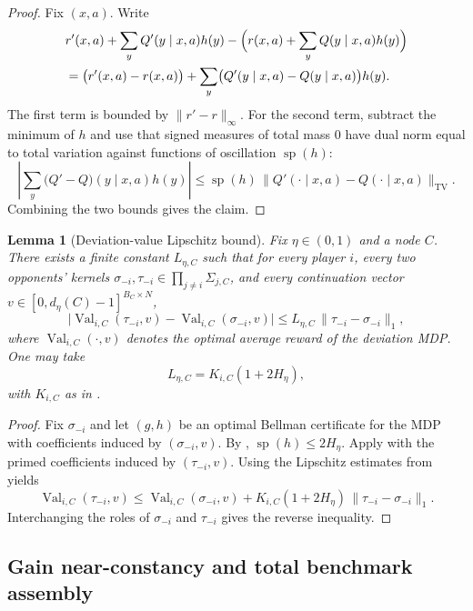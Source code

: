 \documentclass[12pt]{article}
\newtheorem{lemma}[theorem]{Lemma}
\theoremstyle{definition}
\newcommand{\1}{\mathbf{1}}
\DeclareMathOperator{\spn}{sp}
\begin{document}
\begin{proof}
Fix $(x,a)$. Write
\begin{align*}
&r'(x,a)+\sum_y Q'(y\mid x,a)h(y)
-
\Bigl(r(x,a)+\sum_y Q(y\mid x,a)h(y)\Bigr)
\\
&= \bigl(r'(x,a)-r(x,a)\bigr)
+
\sum_y\bigl(Q'(y\mid x,a)-Q(y\mid x,a)\bigr)h(y).
\end{align*}
The first term is bounded by $\|r'-r\|_\infty$. For the second term, subtract the
minimum of $h$ and use that signed measures of total mass $0$ have dual norm equal
to total variation against functions of oscillation $\spn(h)$:
\[
\left|\sum_y\bigl(Q'-Q\bigr)(y\mid x,a)h(y)\right|
\le
\spn(h)\,\|Q'(\cdot\mid x,a)-Q(\cdot\mid x,a)\|_{\mathrm{TV}}.
\]
Combining the two bounds gives the claim.
\end{proof}

\begin{lemma}[Deviation-value Lipschitz bound]
\label{lem:deviation-lipschitz}
Fix $\eta\in(0,1)$ and a node $C$. There exists a finite constant $L_{\eta,C}$
such that for every player $i$, every two opponents' kernels
$\sigma_{-i},\tau_{-i}\in\prod_{j\ne i}\Sigma_{j,C}$, and every continuation vector
$v\in[0,d_\eta(C)-1]^{B_C\times N}$,
\[
\bigl|\operatorname{Val}_{i,C}(\tau_{-i},v)-\operatorname{Val}_{i,C}(\sigma_{-i},v)\bigr|
\le L_{\eta,C}\,\|\tau_{-i}-\sigma_{-i}\|_1,
\]
where $\operatorname{Val}_{i,C}(\cdot,v)$ denotes the optimal average reward of the
deviation MDP. One may take
\[
L_{\eta,C}=K_{i,C}(1+2H_\eta),
\]
with $K_{i,C}$ as in .
\end{lemma}

\begin{proof}
Fix $\sigma_{-i}$ and let $(g,h)$ be an optimal Bellman certificate for the MDP with
coefficients induced by $(\sigma_{-i},v)$. By ,
$\spn(h)\le 2H_\eta$. Apply  with the primed
coefficients induced by $(\tau_{-i},v)$. Using the Lipschitz estimates from
 yields
\[
\operatorname{Val}_{i,C}(\tau_{-i},v)
\le
\operatorname{Val}_{i,C}(\sigma_{-i},v)
+
K_{i,C}(1+2H_\eta)\,\|\tau_{-i}-\sigma_{-i}\|_1.
\]
Interchanging the roles of $\sigma_{-i}$ and $\tau_{-i}$ gives the reverse
inequality.
\end{proof}



\subsection{Gain near-constancy and total benchmark assembly}
\end{document}
